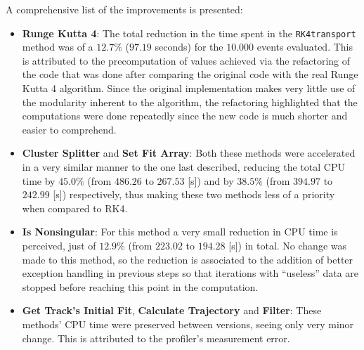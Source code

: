 A comprehensive list of the improvements is presented:
\begin{itemize}
    \item \textbf{Runge Kutta 4}: The total reduction in the time spent in the \texttt{RK4transport} method was of a $12.7\%$ ($97.19$ seconds) for the $10.000$ events evaluated.
    This is attributed to the precomputation of values achieved via the refactoring of the code that was done after comparing the original code with the real Runge Kutta 4 algorithm.
    Since the original implementation makes very little use of the modularity inherent to the algorithm, the refactoring highlighted that the computations were done repeatedly since the new code is much shorter and easier to comprehend.

    \item \textbf{Cluster Splitter} and \textbf{Set Fit Array}: Both these methods were accelerated in a very similar manner to the one last described, reducing the total CPU time by $45.0\%$ (from $486.26$ to $267.53$ [s]) and by $38.5\%$ (from $394.97$ to $242.99$ [s]) respectively, thus making these two methods less of a priority when compared to RK4.
    
    \item \textbf{Is Nonsingular}: For this method a very small reduction in CPU time is perceived, just of $12.9\%$ (from $223.02$ to $194.28$ [s]) in total.
    No change was made to this method, so the reduction is associated to the addition of better exception handling in previous steps so that iterations with ``useless'' data are stopped before reaching this point in the computation.
    
    \item \textbf{Get Track's Initial Fit}, \textbf{Calculate Trajectory} and \textbf{Filter}: These methods' CPU time were preserved between versions, seeing only very minor change.
    This is attributed to the profiler's measurement error.
\end{itemize}
